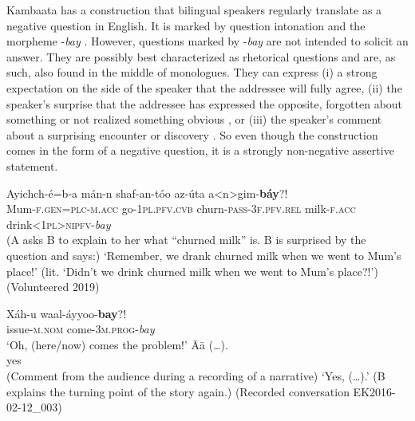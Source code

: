 \documentclass[output=paper,colorlinks,citecolor=brown,draftmode
]{langscibook}
\begin{document}

Kambaata has a construction that bilingual speakers regularly translate as a negative question in English. It is marked by question intonation and the morpheme -\textit{bay} . However, questions marked by -\textit{bay} are not intended to solicit an answer. They are possibly best characterized as rhetorical questions and are, as such, also found in the middle of monologues. They can express (i) a strong expectation on the side of the speaker that the addressee will fully agree, (ii) the speaker’s surprise that the addressee has expressed the opposite, forgotten about something or not realized something obvious , or (iii) the speaker’s comment about a surprising encounter or discovery . So even though the construction comes in the form of a negative question, it is a strongly non-negative assertive statement.

\largerpage
\ea\label{ex:treis:61} 
\gll Ayichch-é=b-a					mán-n		shaf-an-tóo az-úta			a<n>gim-\textbf{báy}?!\\
Mum-\textsc{f.gen=plc-m.acc} go-\textsc{1pl.pfv.cvb}	churn-\textsc{pass-3f.pfv.rel} milk-\textsc{f.acc}		drink<\textsc{1pl}>\textsc{nipfv}-{\textit{bay}}\\
\glt (A asks B to explain to her what “churned milk” is. B is surprised by the question and says:) ‘Remember, we drank churned milk when we went to Mum’s place!’ (lit. ‘Didn’t we drink churned milk when we went to Mum’s place?!’) (Volunteered 2019)
\z 


\ea\label{ex:treis:62} 
    \begin{xlist}[B: ]
        \gll Xáh-u			waal-áyyoo-\textbf{bay}?!	 \\ 
             issue-\textsc{m.nom}	come-\textsc{3m.prog}-\textit{bay}	 \\ 
        \glt ‘Oh, (here/now) comes the problem!’
        \gll Āā (…). \\ 
             yes  \\
        \glt (Comment from the audience during a recording of a narrative) ‘Yes, (…).’ (B explains the turning point of the story again.) (Recorded conversation EK2016-02-12\_003) 
    \end{xlist}
\z 
\end{document}
